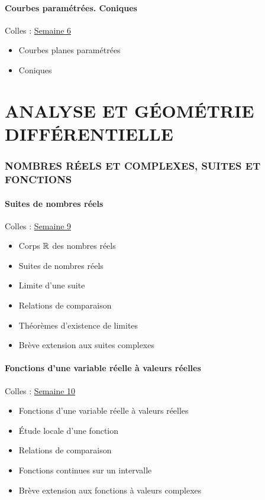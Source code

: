 \subsection{Courbes param\'etr\'ees. Coniques}
Colles : \href{S6.pdf}{Semaine 6}
\begin{itemize}
\item Courbes planes param\'etr\'ees
\item Coniques
\end{itemize}

 \vfill \eject

\part{ANALYSE ET G\'EOM\'ETRIE DIFF\'ERENTIELLE}

\section{NOMBRES R\'EELS ET COMPLEXES, SUITES ET FONCTIONS}

\subsection{Suites de nombres r\'eels}
Colles : \href{S9.pdf}{Semaine 9}
\begin{itemize}
\item Corps $\Bbb{R}$ des nombres r\'eels
\item Suites de nombres r\'eels
\item Limite d'une suite
\item Relations de comparaison
\item Th\'eor\`emes d'existence de limites
\item Br{\`e}ve extension aux suites complexes
\end{itemize}

\subsection{Fonctions d'une variable r\'eelle \`a valeurs r\'eelles}
Colles : \href{S10.pdf}{Semaine 10}
\begin{itemize}
\item Fonctions d'une variable r\'eelle \`a valeurs r\'eelles
\item \'Etude locale d'une fonction
\item Relations de comparaison
\item Fonctions continues sur un intervalle
\item Br{\`e}ve extension aux fonctions \`a valeurs complexes
\end{itemize}

